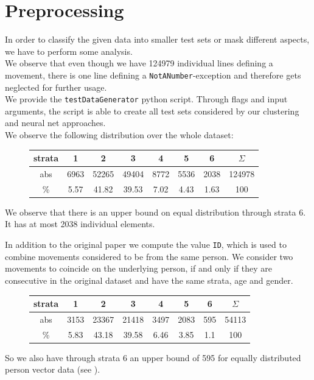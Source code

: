 \documentclass[runningheads]{llncs}
\begin{document}
	\section{Preprocessing}\label{sec: proprocessing}
	In order to classify the given data into smaller test sets or mask different aspects, we have to perform some analysis.\\
	We observe that even though we have 124979 individual lines defining a movement, there is one line defining a \texttt{NotANumber}-exception and therefore gets neglected for further usage.	\\
	We provide the \texttt{testDataGenerator} python script. Through flags and input arguments, the script is able to create all test sets considered by our clustering and neural net approaches.\\
	We observe the following distribution over the whole dataset:\\
	\begin{figure}[H]
		\centering
		\setlength\tabcolsep{.2cm}
		\begin{tabular}{c|ccccccc}
			strata &  1   &   2   &   3   &  4   &  5   &  6   & $\Sigma$ \\ \hline
			abs   & 6963 & 52265 & 49404 & 8772 & 5536 & 2038 &  124978  \\
			\%   & 5.57 & 41.82 & 39.53 & 7.02 & 4.43 & 1.63 &   100
		\end{tabular}
		\label{table: distribution normal}
	\end{figure}
	We observe that there is an upper bound on equal distribution through strata 6. It has at most 2038 individual elements.
	
	In addition to the original paper we compute the value \texttt{ID}, which is used to combine movements considered to be from the same person.
	We consider two movements to coincide on the underlying person, if and only if they are consecutive in the original dataset and have the same strata, age and gender.
	\begin{figure}[H]
		\centering
		\setlength\tabcolsep{.2cm}
		\begin{tabular}{c|ccccccc}
			strata &  1   &   2   &   3   &  4   &  5   &  6  & $\Sigma$ \\ \hline
			 abs   & 3153 & 23367 & 21418 & 3497 & 2083 & 595 &  54113   \\
			  \%   & 5.83 & 43.18 & 39.58 & 6.46 & 3.85 & 1.1 &   100
		\end{tabular}
	\end{figure}
	So we also have through strata 6 an upper bound of 595 for equally distributed person vector data (see ).
	
\end{document}
